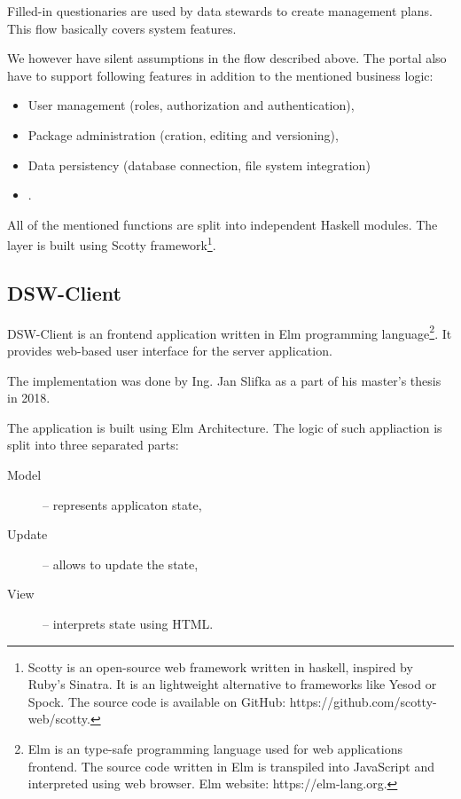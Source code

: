 Filled-in questionaries are used by data stewards to create management plans.
This flow basically covers system features.

We however have silent assumptions in the flow described above.
The portal also have to support following features in addition to the mentioned business logic:

\begin{itemize}
    \item User management (roles, authorization and authentication),
    \item Package administration (cration, editing and versioning),
    \item Data persistency (database connection, file system integration)
    \item {} .
\end{itemize}

All of the mentioned functions are split into independent Haskell modules.
The   layer is built using Scotty framework\footnote{Scotty is an open-source web framework written in haskell, inspired by Ruby's Sinatra. It is an lightweight alternative to frameworks like Yesod or Spock. The source code is available on GitHub: https://github.com/scotty-web/scotty.}.

\subsection{DSW-Client}

DSW-Client is an frontend application written in Elm programming language\footnote{Elm is an type-safe programming language used for web applications frontend. The source code written in Elm is transpiled into JavaScript and interpreted using web browser. Elm website: https://elm-lang.org.}.
It provides web-based user interface for the server application.

The implementation was done by Ing. Jan Slifka as a part of his master's thesis in 2018.

The application is built using Elm Architecture.
The logic of such appliaction is split into three separated parts:

\begin{description}
    \item[Model] -- represents applicaton state,
    \item[Update] -- allows to update the state,
    \item[View] -- interprets state using HTML.
\end{description}

